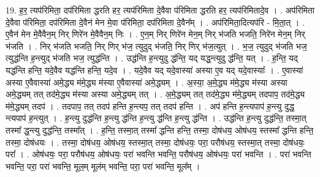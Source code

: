 \documentclass[17pt]{extarticle}
\begin{document}
19. ह॒र॒ त्यप॑रिमिता॒ दप॑रिमिता द्धरति हर॒ त्यप॑रिमिता दे॒वैवा प॑रिमिता द्धरति हर॒ त्यप॑रिमितादे॒व । . अप॑रिमिता दे॒वैवा प॑रिमिता॒ दप॑रिमिता दे॒वैन॑ मेन मे॒वा प॑रिमिता॒ दप॑रिमिता दे॒वैन᳚म् । . अप॑रिमिता॒दित्यप॑रि - मि॒ता॒त् । . ए॒वैन॑ मेन मे॒वैवैन॒म् निर् णिरे॑न मे॒वैवैन॒म् निः । . ए॒न॒म् निर् णिरे॑न मेन॒म् निर् भ॑जति भजति॒ निरे॑न मेन॒म् निर् भ॑जति । . निर् भ॑जति भजति॒ निर् णिर् भ॑ज॒ त्युदुद् भ॑जति॒ निर् णिर् भ॑ज॒त्युत् । . भ॒ज॒ त्युदुद् भ॑जति भज॒ त्युद्ध॑न्ति ह॒न्त्युद् भ॑जति भज॒ त्युद्ध॑न्ति । . उद्ध॑न्ति ह॒न्त्युदु द्ध॑न्ति॒ यद् यद्ध॒न्त्युदु द्ध॑न्ति॒ यत् । . ह॒न्ति॒ यद् यद्ध॑न्ति हन्ति॒ यदे॒वैव यद्ध॑न्ति हन्ति॒ यदे॒व । . यदे॒वैव यद् यदे॒वास्या॑ अस्या ए॒व यद् यदे॒वास्याः᳚ । . ए॒वास्या॑ अस्या ए॒वैवास्या॑ अमे॒द्ध्य म॑मे॒द्ध्य म॑स्या ए॒वैवास्या॑ अमे॒द्ध्यम् । . अ॒स्या॒ अ॒मे॒द्ध्य म॑मे॒द्ध्य म॑स्या अस्या अमे॒द्ध्यम् तत् तद॑मे॒द्ध्य म॑स्या अस्या अमे॒द्ध्यम् तत् । . अ॒मे॒द्ध्यम् तत् तद॑मे॒द्ध्य म॑मे॒द्ध्यम् तदपाप॒ तद॑मे॒द्ध्य म॑मे॒द्ध्यम् तदप॑ । . तदपाप॒ तत् तदप॑ हन्ति ह॒न्त्यप॒ तत् तदप॑ हन्ति । . अप॑ हन्ति ह॒न्त्यपाप॑ ह॒न्त्यु दुद्ध॒ न्त्यपाप॑ ह॒न्त्युत् । . ह॒न्त्यु दुद्ध॑न्ति ह॒न्त्यु द्ध॑न्ति ह॒न्त्यु द्ध॑न्ति ह॒न्त्यु द्ध॑न्ति । . उद्ध॑न्ति ह॒न्त्यु दुद्ध॑न्ति॒ तस्मा॒त् तस्मा᳚ द्ध॒न्त्यु दुद्ध॑न्ति॒ तस्मा᳚त् । . ह॒न्ति॒ तस्मा॒त् तस्मा᳚ द्धन्ति हन्ति॒ तस्मा॒ दोष॑धय॒ ओष॑धय॒ स्तस्मा᳚ द्धन्ति हन्ति॒ तस्मा॒ दोष॑धयः । . तस्मा॒ दोष॑धय॒ ओष॑धय॒ स्तस्मा॒त् तस्मा॒ दोष॑धयः॒ परा॒ परौष॑धय॒ स्तस्मा॒त् तस्मा॒ दोष॑धयः॒ परा᳚ । . ओष॑धयः॒ परा॒ परौष॑धय॒ ओष॑धयः॒ परा॑ भवन्ति भवन्ति॒ परौष॑धय॒ ओष॑धयः॒ परा॑ भवन्ति । . परा॑ भवन्ति भवन्ति॒ परा॒ परा॑ भवन्ति॒ मूल॒म् मूल॑म् भवन्ति॒ परा॒ परा॑ भवन्ति॒ मूल᳚म् । \newline
\end{document}
